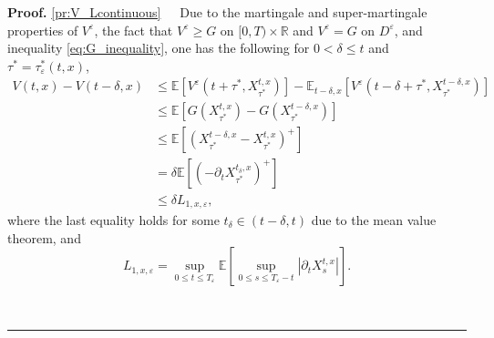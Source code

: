 \documentclass{tufte-handout}
\newcommand{\E}{\mathbb{E}} %
\newcommand{\R}{\mathbb{R}} %
\newenvironment{pf}[1][Proof]{\textbf{#1.} }{\ \rule{0.5em}{0.5em}}
\begin{document}
	\begin{pf}
		\ref{pr:V_Lcontinuous}\ \ \ Due to the martingale and super-martingale properties of $V^\varepsilon$, the fact that $V^\varepsilon \geq G$ on $[0, T)\times\R$ and $V^\varepsilon = G$ on $D^\varepsilon$, and inequality \eqref{eq:G_inequality}, one has the following for $0 < \delta \leq t$ and $\tau^* = \tau_\varepsilon^*(t, x)$, 
		\begin{align}
		V(t, x) - V(t - \delta, x) &\leq \E\left[V^\varepsilon(t + \tau^*, X_{\tau^*}^{t, x})\right] - \E_{t - \delta, x}\left[V^\varepsilon(t - \delta + \tau^*, X_{\tau^*}^{t - \delta, x})\right] \nonumber \\
		&\leq \E\left[G\left(X_{\tau^*}^{t, x}\right) - G\left(X_{\tau^*}^{t - \delta, x}\right)\right] \nonumber \\
		&\leq \E\left[\left(X_{\tau^*}^{t - \delta, x} - X_{\tau^*}^{t, x}\right)^+\right] \nonumber \\
		&= \delta\E\left[\left(-\partial_tX_{\tau^*}^{t_\delta, x}\right)^+\right] \label{eq:V^epst-V^epst-delta<} \\
		&\leq \delta L_{1, x, \varepsilon}, \nonumber
		\end{align}
		where the last equality holds for some $t_\delta\in(t - \delta, t)$ due to the mean value theorem, and
		$$
		L_{1, x, \varepsilon} = \sup_{0\leq t \leq T_\varepsilon}\E\left[\sup_{0\leq s \leq T_\varepsilon - t}|\partial_tX_s^{t, x}|\right].
		$$
		

\end{pf}
\end{document}
